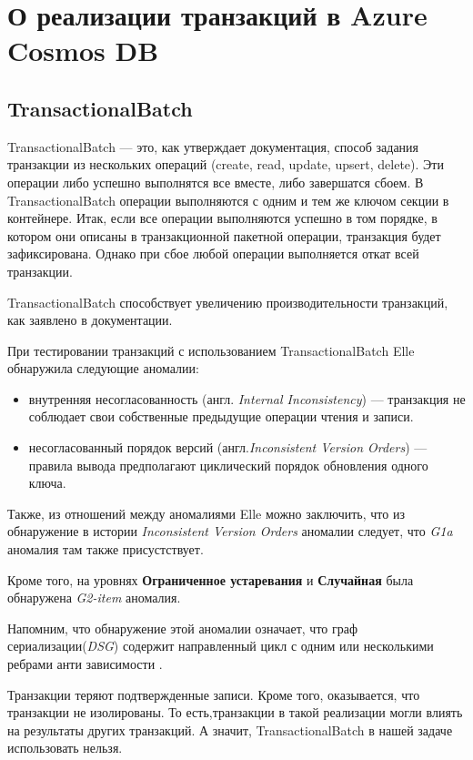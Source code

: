 \documentclass[12pt,  openany]{book}
\begin{document}
\section{О реализации транзакций в Azure Cosmos DB}
\subsection{TransactionalBatch}
TransactionalBatch --- это, как утверждает документация, способ задания транзакции из нескольких операций (create, read, update, upsert, delete). Эти операции либо успешно выполнятся все вместе, либо завершатся сбоем.  В TransactionalBatch операции выполняются с одним и тем же ключом секции в контейнере.  Итак, если все операции выполняются успешно в том порядке, в котором они описаны в транзакционной пакетной операции, транзакция будет зафиксирована. Однако при сбое любой операции выполняется откат всей транзакции.
\par TransactionalBatch способствует увеличению производительности транзакций, как заявлено в документации.
\par При тестировании транзакций с использованием TransactionalBatch Elle обнаружила следующие аномалии:
\begin{itemize}
\item внутренняя несогласованность (англ. \textit{Internal Inconsistency}) --- транзакция не соблюдает свои собственные предыдущие операции чтения и записи.
\item несогласованный порядок версий (англ.\textit{Inconsistent Version Orders}) --- правила вывода предполагают циклический порядок обновления одного ключа.
\end{itemize}
Также, из отношений между аномалиями Elle\cite{Kingsbury2020ElleII} можно заключить, что из обнаружение в истории  \textit{Inconsistent Version Orders} аномалии следует, что \textit{G1a} аномалия там также присустствует.
\par Кроме того, на уровнях \textbf{Ограниченное устаревания} и \textbf{Случайная} была обнаружена \textit{G2-item} аномалия. 
\par Напомним, что обнаружение этой аномалии означает, что граф сериализации(\textit{DSG}) содержит направленный цикл с одним или несколькими ребрами анти зависимости \cite{IsolationLevelDefinitions}.

\par Транзакции теряют подтвержденные записи.  Кроме того, оказывается, что транзакции не изолированы. То есть,транзакции в такой реализации могли влиять на результаты других транзакций.
А значит, TransactionalBatch в нашей задаче использовать нельзя.
\end{document}
